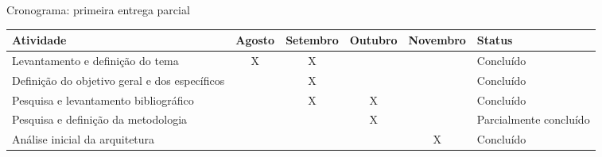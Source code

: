 \begin{quadro}
    \caption{Cronograma: primeira entrega parcial\label{quad:CronogramaTCC1}}
    \begin{tabular}{ | m{4cm} | c | c | c | c | m{2.5cm} | }
    \hline
    \textbf{Atividade} &
        \textbf{Agosto} &
        \textbf{Setembro} &
        \textbf{Outubro} &
        \textbf{Novembro} &
        \textbf{Status} \\ \hline
    Levantamento e definição do tema &
        X &
        X &
        &
        &
        Concluído \\ \hline
    Definição do objetivo geral e dos específicos &
        &
        X &
        &
        &
        Concluído \\ \hline
    Pesquisa e levantamento bibliográfico &
        &
        X &
        X &
        &
        Concluído \\ \hline
    Pesquisa e definição da metodologia &
        &
        &
        X &
        &
        Parcialmente concluído \\ \hline
    Análise inicial da arquitetura &
        &
        &
        &
        X &
        Concluído \\ \hline
    \end{tabular}
\end{quadro}
